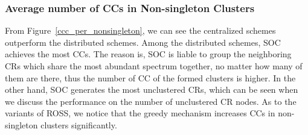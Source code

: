 \documentclass[10pt,journal,compsoc]{IEEEtran}
\theoremstyle{mytheoremstyle}
\theoremstyle{mytheoremstyle}
\theoremstyle{mytheoremstyle}
\begin{document}
\subsubsection{Average number of CCs in Non-singleton Clusters}
\label{ccc_20}
From Figure~\ref{ccc_per_nonsingleton}, we can see the centralized schemes outperform the distributed schemes.
Among the distributed schemes, SOC achieves the most CCs.
The reason is, SOC is liable to group the neighboring CRs which share the most abundant spectrum together, no matter how many of them are there, thus the number of CC of the formed clusters is higher.
In the other hand, SOC generates the most unclustered CRs, which can be seen when we discuss the performance on the number of unclustered CR nodes. 
As to the variants of ROSS, we notice that the greedy mechanism increases CCs in non-singleton clusters significantly.

\end{document}

